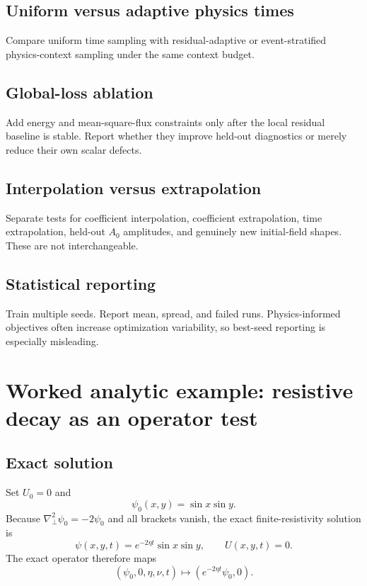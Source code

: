 \documentclass[11pt]{article}
\newcommand{\Lap}{\nabla_\perp^2}
\begin{document}
\subsection{Uniform versus adaptive physics times}
Compare uniform time sampling with residual-adaptive or event-stratified physics-context sampling under the same context budget.

\subsection{Global-loss ablation}
Add energy and mean-square-flux constraints only after the local residual baseline is stable. Report whether they improve held-out diagnostics or merely reduce their own scalar defects.

\subsection{Interpolation versus extrapolation}
Separate tests for coefficient interpolation, coefficient extrapolation, time extrapolation, held-out $A_0$ amplitudes, and genuinely new initial-field shapes. These are not interchangeable.

\subsection{Statistical reporting}
Train multiple seeds. Report mean, spread, and failed runs. Physics-informed objectives often increase optimization variability, so best-seed reporting is especially misleading.

\section{Worked analytic example: resistive decay as an operator test}
\label{sec:example}

\subsection{Exact solution}
Set $U_0=0$ and
\begin{equation}
\psi_0(x,y)=\sin x\sin y.
\end{equation}
Because $\Lap\psi_0=-2\psi_0$ and all brackets vanish, the exact finite-resistivity solution is
\begin{equation}
\psi(x,y,t)=e^{-2\eta t}\sin x\sin y,
\qquad U(x,y,t)=0.
\label{eq:decay_exact}
\end{equation}
The exact operator therefore maps
\begin{equation}
(\psi_0,0,\eta,\nu,t)
\longmapsto
(e^{-2\eta t}\psi_0,0).
\end{equation}
\end{document}
